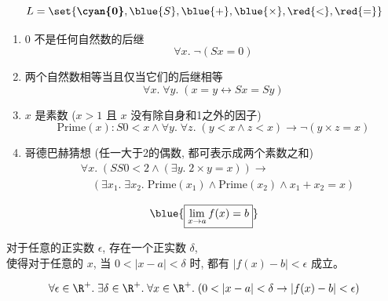 \begin{frame}{}
  \[
    L = \set{\textbf{\cyan{0}}, \blue{S}, \blue{+}, \blue{\times}, \red{<}, \red{=}}
  \]

  \vspace{0.30cm}
  \begin{enumerate}[(1)]
    \setlength{\itemsep}{8pt}
    \pause
    \item 0 不是任何自然数的后继
      \pause
      \[
        \forall x.\; \lnot (Sx = 0)
      \]
    \pause
    \vspace{-0.50cm}
    \item 两个自然数相等当且仅当它们的后继相等
      \pause
      \[
        \forall x.\; \forall y.\; (x = y \leftrightarrow Sx = Sy)
      \]
    \pause
    \vspace{-0.50cm}
    \item $x$ 是素数 ($x > 1$ 且 $x$ 没有除自身和1之外的因子)
      \pause
      \[
        \text{Prime}(x): S0 < x \land \forall y.\; \forall z.\; (y < x \land z < x) \to \lnot (y \times z = x)
      \]
    \pause
    \vspace{-0.50cm}
    \item 哥德巴赫猜想 (任一大于2的偶数, 都可表示成两个素数之和)
      \pause
      \begin{align*}
        &\forall x.\; (SS0 < 2 \land (\exists y.\; 2 \times y = x)) \to \\
          &\quad (\exists x_{1}.\; \exists x_{2}.\; \text{Prime}(x_{1}) \land \text{Prime}(x_{2})
            \land x_{1} + x_{2} = x)
      \end{align*}
  \end{enumerate}
\end{frame}

\begin{frame}{}
  \[
    \blue{\boxed{\lim_{x \to a} f(x) = b}}
  \]

  \pause
  \vspace{0.30cm}
  \begin{center}
    对于任意的正实数 $\epsilon$, 存在一个正实数 $\delta$, \\[6pt]
    使得对于任意的 $x$, 当 $0 < |x - a| < \delta$ 时, 都有 $|f(x) - b| < \epsilon$ 成立。
  \end{center}

  \pause
  \[
    \forall \epsilon \in \R^{+}.\; \exists \delta \in \R^{+}.\;
      \forall x \in \R^{+}.\; (0 < |x - a| < \delta \to |f(x) - b| < \epsilon)
  \]
\end{frame}

